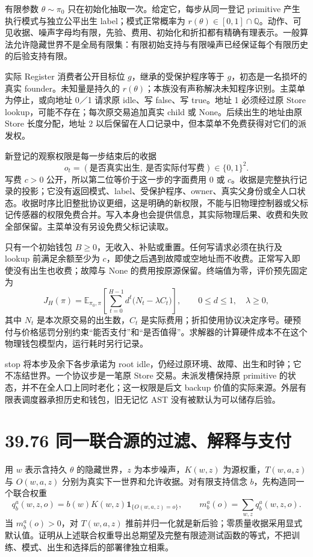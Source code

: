\documentclass[
  11pt,
  oneside]{book}
\begin{document}
有限参数 \(\theta\sim\pi_0\) 只在初始化抽取一次。给定它，每步从同一登记 primitive 产生执行模式与独立公平出生 label；模式正常概率为 \(r(\theta)\in[0,1]\cap\mathbb Q\)。动作、可见收据、噪声字母均有限，先验、费用、初始化和折扣都有精确有理表示。一般算法允许隐藏世界不是全局有限集：有限初始支持与有限噪声已经保证每个有限历史的后验支持有限。

实际 Register 消费者公开目标位 \(g\)，继承的受保护程序等于 \(g\)，初态是一名损坏的真实 founder。未知量是持久的 \(r(\theta)\)；本族没有声称解决未知程序识别。主菜单为停止，或向地址 0／1 请求原 idle、写 false、写 true。地址 1 必须经过原 Store lookup，可能不存在；每次原交易追加真实 child 或 None。后续出生的地址由原 Store 长度分配，地址 2 以后保留在人口记录中，但本菜单不免费获得对它们的派发权。

新登记的观察权限是每一步结束后的收据 \[o_t=(\text{是否真实出生},\ \text{是否实际付写费})\in\{0,1\}^2.\] 写费 \(c>0\) 公开，所以第二位等价于这一步的字面费用 \(0\) 或 \(c\)。收据是完整执行记录的投影；它没有返回模式、label、受保护程序、owner、真实父身份或全人口状态。收据时序比旧整批协议更细，这是明确的新权限，不能与旧物理控制器或父标记传感器的权限免费合并。写入本身也会提供信息，其实际物理后果、收费和失败全部保留。主菜单没有另设免费父标记读取。

只有一个初始钱包 \(B\ge0\)，无收入、补贴或重置。任何写请求必须在执行及 lookup 前满足余额至少为 \(c\)，即使之后遇到故障或空地址而不收费。正常写入即使没有出生也收费；故障与 None 的费用按原源保留。终端值为零，评价预先固定为 \[J_H(\pi)=\mathbb E_{\pi_0,\pi}\!\left[
\sum_{t=0}^{H-1}d^t\bigl(N_t-\lambda C_t\bigr)\right],
\qquad 0\le d\le1,\quad\lambda\ge0,\] 其中 \(N_t\) 是本次原交易的出生数，\(C_t\) 是实际费用；折扣使用协议决定序号。硬预付与价格惩罚分别约束``能否支付''和``是否值得''。求解器的计算硬件成本不在这个物理钱包模型内，运行耗时另行记录。

stop 将本步及余下各步承诺为 root idle，仍经过原环境、故障、出生和时钟；它不冻结世界。一个协议步是一笔原 Store 交易。未派发槽保持原 primitive 的状态，并不在全人口上同时老化；这一权限是后文 backup 价值的实际来源。外层有限表调度器承担历史和钱包，旧无记忆 AST 没有被默认为可以储存后验。

\section{39.76 同一联合源的过滤、解释与支付}\label{ux540cux4e00ux8054ux5408ux6e90ux7684ux8fc7ux6ee4ux89e3ux91caux4e0eux652fux4ed8}

用 \(w\) 表示含持久 \(\theta\) 的隐藏世界，\(z\) 为本步噪声，\(K(w,z)\) 为源权重，\(T(w,a,z)\) 与 \(O(w,a,z)\) 分别为真实下一世界和允许收据。对有限支持信念 \(b\)，先构造同一个联合权重 \[q_b^a(w,z,o)=b(w)K(w,z)\mathbf1_{\{O(w,a,z)=o\}},
\qquad m_b^a(o)=\sum_{w,z}q_b^a(w,z,o).\] 当 \(m_b^a(o)>0\)，对 \(T(w,a,z)\) 推前并归一化就是新后验；零质量收据采用显式默认值。证明从上述联合权重导出总期望及完整有限迹测试函数的等式，不把训练、模式、出生和选择后的部署律独立相乘。
\end{document}
